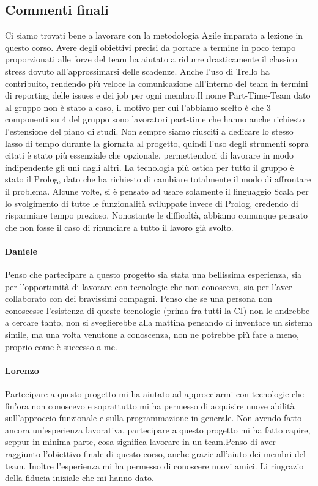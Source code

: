 \subsection{Commenti finali}
Ci siamo trovati bene a lavorare con la metodologia Agile imparata a lezione in questo corso. Avere degli obiettivi precisi da portare a termine in poco tempo proporzionati alle forze del team ha aiutato a ridurre drasticamente il classico stress dovuto all’approssimarsi delle scadenze. \newline \newline Anche l’uso di Trello ha contribuito, rendendo più veloce la comunicazione all’interno del team in termini di reporting delle issues e dei job per ogni membro.\newline \newline Il nome Part-Time-Team dato al gruppo non è stato a caso, il motivo per cui l’abbiamo scelto è che 3 componenti su 4 del gruppo sono lavoratori part-time che hanno anche richiesto l’estensione del piano di studi. Non sempre siamo riusciti a dedicare lo stesso lasso di tempo durante la giornata al progetto, quindi l’uso degli strumenti sopra citati è stato più essenziale che opzionale, permettendoci di lavorare in modo indipendente gli uni dagli altri. \newline \newline La tecnologia più ostica per tutto il gruppo è stato il Prolog, dato che ha richiesto di cambiare totalmente il modo di affrontare il problema. Alcune volte, si è pensato ad usare solamente il linguaggio Scala per lo svolgimento di tutte le funzionalità sviluppate invece di Prolog, credendo di risparmiare tempo prezioso. Nonostante le difficoltà, abbiamo comunque pensato che non fosse il caso di rinunciare a tutto il lavoro già svolto. 
\paragraph{Daniele}
Penso che partecipare a questo progetto sia stata una bellissima esperienza, sia per l’opportunità di lavorare con tecnologie che non conoscevo, sia per l’aver collaborato con dei bravissimi compagni. Penso che se una persona non conoscesse l’esistenza di queste tecnologie (prima fra tutti la CI) non le andrebbe a cercare tanto, non si sveglierebbe alla mattina pensando di inventare un sistema simile, ma una volta venutone a conoscenza, non ne potrebbe più fare a meno, proprio come è successo a me.
\paragraph{Lorenzo}
Partecipare a questo progetto mi ha aiutato ad approcciarmi con tecnologie che fin'ora non conoscevo e soprattutto mi ha permesso di acquisire nuove abilità sull'approccio funzionale e sulla programmazione in generale. Non avendo fatto ancora un'esperienza lavorativa, partecipare a questo progetto mi ha fatto capire, seppur in minima parte, cosa significa lavorare in un team.\newline Penso di aver raggiunto l'obiettivo finale di questo corso, anche grazie all'aiuto dei membri del team. Inoltre l'esperienza mi ha permesso di conoscere nuovi amici. Li ringrazio della fiducia iniziale che mi hanno dato.
